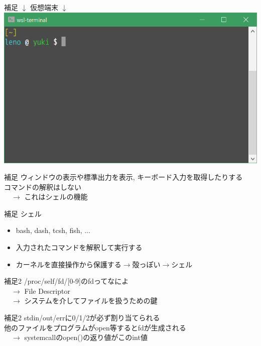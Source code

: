 \documentclass[uplatex, dvipdfmx, unicode]{beamer}
\begin{document}
\begin{frame}{補足}
  \centering
  \Huge
  $\downarrow$ 仮想端末 $\downarrow$ \\
  \includegraphics[keepaspectratio, scale=.5]{./img/ptty.png}
\end{frame}

\begin{frame}{補足}
  ウィンドウの表示や標準出力を表示, キーボード入力を取得したりする \\
  \alert{コマンドの解釈はしない} \\
  \ \ $\rightarrow$ これは\alert{シェル}の機能
\end{frame}

\begin{frame}{補足}
  シェル
  \begin{itemize}
    \item{bash, dash, tcsh, fish, ...}
    \item{入力されたコマンドを解釈して実行する}
    \item{カーネルを直接操作から保護する$\rightarrow$殻っぽい$\rightarrow$シェル}
  \end{itemize}
\end{frame}

\begin{frame}{補足2}
  /proc/self/fd/[0-9]のfdってなによ \\
  \ \ $\rightarrow$ File Descriptor \\
  \ \ $\rightarrow$ システムを介してファイルを扱うための鍵
\end{frame}

\begin{frame}{補足2}
  stdin/out/errに0/1/2が必ず割り当てられる \\
  他のファイルをプログラムがopen等するとfdが生成される \\
  \ \ $\rightarrow$ systemcallのopen()の返り値がこのint値
\end{frame}
\end{document}
